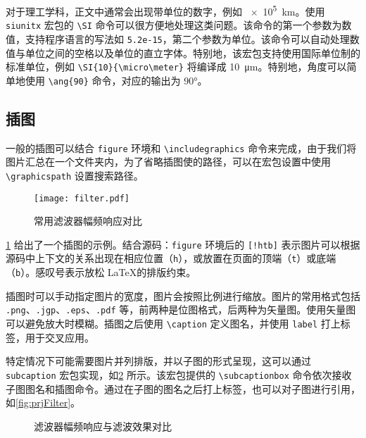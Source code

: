 对于理工学科，正文中通常会出现带单位的数字，例如 \SI{e5}{km}。使用 \verb|siunitx| 宏包的 \verb|\SI| 命令可以很方便地处理这类问题。该命令的第一个参数为数值，支持程序语言的写法如 \verb|5.2e-15|，第二个参数为单位。该命令可以自动处理数值与单位之间的空格以及单位的直立字体。特别地，该宏包支持使用国际单位制的标准单位，例如 \verb|\SI{10}{\micro\meter}| 将编译成 \SI{10}{\micro\meter}。特别地，角度可以简单地使用 \verb|\ang{90}| 命令，对应的输出为 \ang{90}。


\subsection{插图} \label{subsec:figures}

一般的插图可以结合 \verb|figure| 环境和 \verb|\includegraphics| 命令来完成，由于我们将图片汇总在一个文件夹内，为了省略插图使的路径，可以在宏包设置中使用 \verb|\graphicspath| 设置搜索路径。


\begin{figure}[!htb]
    \centering
    \texttt{[image: filter.pdf]}
    \caption{常用滤波器幅频响应对比}
    \label{fig:filter}
\end{figure}


\cref{fig:filter} 给出了一个插图的示例。结合源码：\verb|figure| 环境后的 \verb|[!htb]| 表示图片可以根据源码中上下文的关系出现在相应位置（\verb|h|），或放置在页面的顶端（\verb|t|）或底端（\verb|b|）。感叹号表示放松 \LaTeX 的排版约束。


插图时可以手动指定图片的宽度，图片会按照比例进行缩放。图片的常用格式包括 \verb|.png|、\verb|.jgp|、\verb|.eps|、\verb|.pdf| 等，前两种是位图格式，后两种为矢量图。使用矢量图可以避免放大时模糊。插图之后使用 \verb|\caption| 定义图名，并使用 \verb|label| 打上标签，用于交叉应用。


特定情况下可能需要图片并列排版，并以子图的形式呈现，这可以通过 \verb|subcaption| 宏包实现，如\cref{fig:FilterCompare} 所示。该宏包提供的 \verb|\subcaptionbox| 命令依次接收子图图名和插图命令。通过在子图的图名之后打上标签，也可以对子图进行引用，如\cref{fig:prjFilter}。


\begin{figure}[!htb]
    \centering
    \hspace{5mm}
    \caption{滤波器幅频响应与滤波效果对比}
    \label{fig:FilterCompare}
\end{figure}


